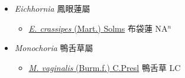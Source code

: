 
  \begin{itemize}
 \item[] \textit{Eichhornia} 鳳眼蓮屬
                    
  \begin{itemize}
        \item[] \href{http://www.theplantlist.org/tpl1.1/search?q=Eichhornia+crassipes}{\textit{E. crassipes} (Mart.) Solms}   布袋蓮 NA$^n$
  \end{itemize}
 \item[] \textit{Monochoria} 鴨舌草屬
                    
  \begin{itemize}
        \item[] \href{http://www.theplantlist.org/tpl1.1/search?q=Monochoria+vaginalis}{\textit{M. vaginalis} (Burm.f.) C.Presl}   鴨舌草 LC
  \end{itemize}
  \end{itemize}
